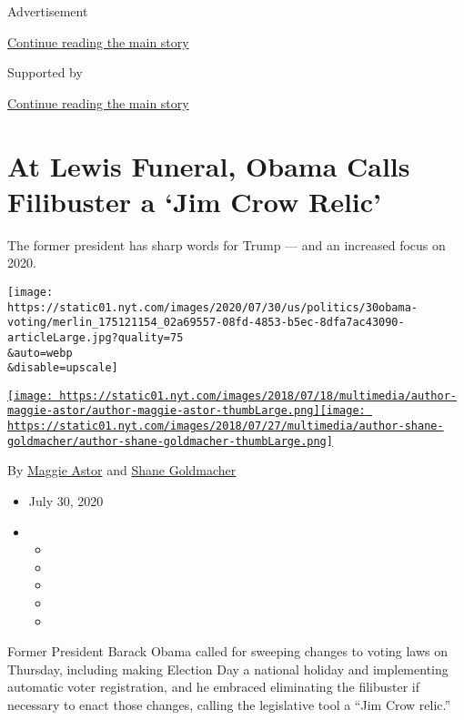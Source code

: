 Advertisement

\protect\hyperlink{after-top}{Continue reading the main story}

Supported by

\protect\hyperlink{after-sponsor}{Continue reading the main story}

\hypertarget{at-lewis-funeral-obama-calls-filibuster-a-jim-crow-relic}{%
\section{At Lewis Funeral, Obama Calls Filibuster a `Jim Crow
Relic'}\label{at-lewis-funeral-obama-calls-filibuster-a-jim-crow-relic}}

The former president has sharp words for Trump --- and an increased
focus on 2020.

\texttt{[image: https://static01.nyt.com/images/2020/07/30/us/politics/30obama-voting/merlin\_175121154\_02a69557-08fd-4853-b5ec-8dfa7ac43090-articleLarge.jpg?quality=75\\\&auto=webp\\\&disable=upscale]}

\href{https://www.nytimes.com/by/maggie-astor}{\texttt{[image: https://static01.nyt.com/images/2018/07/18/multimedia/author-maggie-astor/author-maggie-astor-thumbLarge.png]}}\href{https://www.nytimes.com/by/shane-goldmacher}{\texttt{[image: https://static01.nyt.com/images/2018/07/27/multimedia/author-shane-goldmacher/author-shane-goldmacher-thumbLarge.png]}}

By \href{https://www.nytimes.com/by/maggie-astor}{Maggie Astor} and
\href{https://www.nytimes.com/by/shane-goldmacher}{Shane Goldmacher}

\begin{itemize}
\item
  July 30, 2020
\item
  \begin{itemize}
  \item
  \item
  \item
  \item
  \item
  \end{itemize}
\end{itemize}

Former President Barack Obama called for sweeping changes to voting laws
on Thursday, including making Election Day a national holiday and
implementing automatic voter registration, and he embraced eliminating
the filibuster if necessary to enact those changes, calling the
legislative tool a ``Jim Crow relic.''

